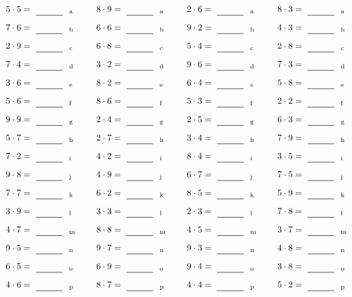 \documentclass
[
  draft    = true,
  fontsize = 11pt,
  parskip  = half-
]
{scrartcl}
\begin{document}
\par\vfill\par
\begin{align*}
    \pline{5\cdot5}&=\rline{a}
  & \pline{8\cdot9}&=\rline{a}
  & \pline{2\cdot6}&=\rline{a}
  & \pline{8\cdot3}&=\rline{a} \\[1ex]
    \pline{7\cdot6}&=\rline{b}
  & \pline{6\cdot6}&=\rline{b}
  & \pline{9\cdot2}&=\rline{b}
  & \pline{4\cdot3}&=\rline{b} \\[1ex]
    \pline{2\cdot9}&=\rline{c}
  & \pline{6\cdot8}&=\rline{c}
  & \pline{5\cdot4}&=\rline{c}
  & \pline{2\cdot8}&=\rline{c} \\[1ex]
    \pline{7\cdot4}&=\rline{d}
  & \pline{3\cdot2}&=\rline{d}
  & \pline{9\cdot6}&=\rline{d}
  & \pline{7\cdot3}&=\rline{d} \\[1ex]
    \pline{3\cdot6}&=\rline{e}
  & \pline{8\cdot2}&=\rline{e}
  & \pline{6\cdot4}&=\rline{e}
  & \pline{5\cdot8}&=\rline{e} \\[1ex]
    \pline{5\cdot6}&=\rline{f}
  & \pline{8\cdot6}&=\rline{f}
  & \pline{5\cdot3}&=\rline{f}
  & \pline{2\cdot2}&=\rline{f} \\[1ex]
    \pline{9\cdot9}&=\rline{g}
  & \pline{2\cdot4}&=\rline{g}
  & \pline{2\cdot5}&=\rline{g}
  & \pline{6\cdot3}&=\rline{g} \\[1ex]
    \pline{5\cdot7}&=\rline{h}
  & \pline{2\cdot7}&=\rline{h}
  & \pline{3\cdot4}&=\rline{h}
  & \pline{7\cdot9}&=\rline{h} \\[1ex]
    \pline{7\cdot2}&=\rline{i}
  & \pline{4\cdot2}&=\rline{i}
  & \pline{8\cdot4}&=\rline{i}
  & \pline{3\cdot5}&=\rline{i} \\[1ex]
    \pline{9\cdot8}&=\rline{j}
  & \pline{4\cdot9}&=\rline{j}
  & \pline{6\cdot7}&=\rline{j}
  & \pline{7\cdot5}&=\rline{j} \\[1ex]
    \pline{7\cdot7}&=\rline{k}
  & \pline{6\cdot2}&=\rline{k}
  & \pline{8\cdot5}&=\rline{k}
  & \pline{5\cdot9}&=\rline{k} \\[1ex]
    \pline{3\cdot9}&=\rline{l}
  & \pline{3\cdot3}&=\rline{l}
  & \pline{2\cdot3}&=\rline{l}
  & \pline{7\cdot8}&=\rline{l} \\[1ex]
    \pline{4\cdot7}&=\rline{m}
  & \pline{8\cdot8}&=\rline{m}
  & \pline{4\cdot5}&=\rline{m}
  & \pline{3\cdot7}&=\rline{m} \\[1ex]
    \pline{9\cdot5}&=\rline{n}
  & \pline{9\cdot7}&=\rline{n}
  & \pline{9\cdot3}&=\rline{n}
  & \pline{4\cdot8}&=\rline{n} \\[1ex]
    \pline{6\cdot5}&=\rline{o}
  & \pline{6\cdot9}&=\rline{o}
  & \pline{9\cdot4}&=\rline{o}
  & \pline{3\cdot8}&=\rline{o} \\[1ex]
    \pline{4\cdot6}&=\rline{p}
  & \pline{8\cdot7}&=\rline{p}
  & \pline{4\cdot4}&=\rline{p}
  & \pline{5\cdot2}&=\rline{p}
\end{align*}
\end{document}

